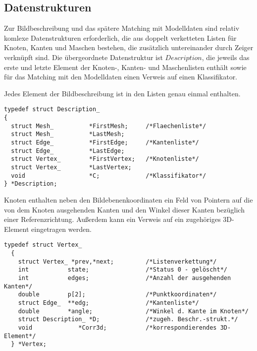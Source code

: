 \subsection{Datenstrukturen}

Zur Bildbeschreibung und das spätere Matching mit Modelldaten sind relativ
komlexe Datenstrukturen erforderlich, die aus doppelt verketteten Listen 
für Knoten, Kanten und Maschen bestehen, die zusätzlich untereinander durch 
Zeiger
verknüpft sind. Die übergeordnete Datenstruktur ist $Description$, die jeweils
das erste und letzte Element der Knoten-, Kanten- und Maschenlisten enthält
sowie für das Matching mit den Modelldaten einen Verweis auf einen
Klassifikator.

Jedes Element der Bildbeschreibung ist in den Listen genau einmal enthalten.
\begprogr\begin{verbatim}
typedef struct Description_
{
  struct Mesh_          *FirstMesh;     /*Flaechenliste*/
  struct Mesh_          *LastMesh;
  struct Edge_          *FirstEdge;     /*Kantenliste*/
  struct Edge_          *LastEdge;
  struct Vertex_        *FirstVertex;   /*Knotenliste*/
  struct Vertex_        *LastVertex;
  void                  *C;             /*Klassifikator*/
} *Description;
\end{verbatim}\endprogr
Knoten enthalten neben den Bildebenenkoordinaten ein Feld von Pointern auf die
von dem Knoten ausgehenden Kanten und den Winkel dieser Kanten bezüglich einer
Referenzrichtung. Außerdem kann ein Verweis auf ein zugehöriges 3D-Element
eingetragen werden.
\begprogr\begin{verbatim}
typedef struct Vertex_
  {
    struct Vertex_ *prev,*next;         /*Listenverkettung*/
    int           state;                /*Status 0 - gelöscht*/
    int           edges;                /*Anzahl der ausgehenden Kanten*/
    double        p[2];                 /*Punktkoordinaten*/
    struct Edge_  **edg;                /*Kantenliste*/
    double        *angle;               /*Winkel d. Kante im Knoten*/
    struct Description_ *D;             /*zugeh. Beschr.-strukt.*/
    void             *Corr3d;           /*korrespondierendes 3D-Element*/
  } *Vertex;
\end{verbatim}\endprogr

